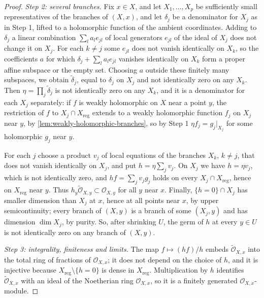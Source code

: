 \begin{proof}
\emph{Step 2: several branches.} Fix $x\in X$, and let $X_1,\ldots,X_p$ be sufficiently small representatives of the branches of $(X,x)$, and let $\delta_j$ be a denominator for $X_j$ as in Step 1, lifted to a holomorphic function of the ambient coordinates. Adding to $\delta_j$ a linear combination $\sum_la_le_{jl}$ of local generators $e_{jl}$ of the ideal of $X_j$ does not change it on $X_j$. For each $k\neq j$ some $e_{jl}$ does not vanish identically on $X_k$, so the coefficients $a$ for which $\delta_j+\sum_la_le_{jl}$ vanishes identically on $X_k$ form a proper affine subspace or the empty set. Choosing $a$ outside these finitely many subspaces, we obtain $\widetilde\delta_j$, equal to $\delta_j$ on $X_j$ and not identically zero on any $X_k$. Then $\eta=\prod_j\widetilde\delta_j$ is not identically zero on any $X_k$, and it is a denominator for each $X_j$ separately: if $f$ is weakly holomorphic on $X$ near a point $y$, the restriction of $f$ to $X_j\cap X_{\mathrm{reg}}$ extends to a weakly holomorphic function $f_j$ on $X_j$ near $y$, by \cref{lem:weakly-holomorphic-branches}, so by Step 1 $\eta f_j=g_j|_{X_j}$ for some holomorphic $g_j$ near $y$.

For each $j$ choose a product $v_j$ of local equations of the branches $X_k$, $k\neq j$, that does not vanish identically on $X_j$, and put $h=\eta\sum_jv_j$. On $X_j$ we have $h=\eta v_j$, which is not identically zero, and $hf=\sum_jv_jg_j$ holds on every $X_j\cap X_{\mathrm{reg}}$, hence on $X_{\mathrm{reg}}$ near $y$. Thus $h_y\widetilde{\mathcal O}_{X,y}\subset\mathcal O_{X,y}$ for all $y$ near $x$. Finally, $\{h=0\}\cap X_j$ has smaller dimension than $X_j$ at $x$, hence at all points near $x$, by upper semicontinuity; every branch of $(X,y)$ is a branch of some $(X_j,y)$ and has dimension $\dim X_j$, by purity. So, after shrinking $U$, the germ of $h$ at every $y\in U$ is not identically zero on any branch of $(X,y)$.

\emph{Step 3: integrality, finiteness and limits.} The map $f\mapsto(hf)/h$ embeds $\widetilde{\mathcal O}_{X,x}$ into the total ring of fractions of $\mathcal O_{X,x}$; it does not depend on the choice of $h$, and it is injective because $X_{\mathrm{reg}}\setminus\{h=0\}$ is dense in $X_{\mathrm{reg}}$. Multiplication by $h$ identifies $\widetilde{\mathcal O}_{X,x}$ with an ideal of the Noetherian ring $\mathcal O_{X,x}$, so it is a finitely generated $\mathcal O_{X,x}$-module.


\end{proof}
